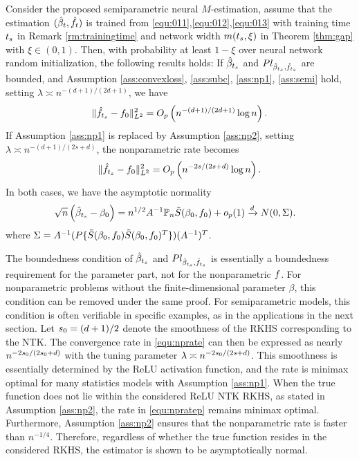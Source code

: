 \begin{theorem}\label{thm:main}
Consider the proposed semiparametric neural $M$-estimation, assume that the estimation $(\hat{\beta}_{t},\hat{f}_{t})$ is trained from \eqref{equ:011},\eqref{equ:012},\eqref{equ:013} with training time $t_{s}$ in Remark \ref{rm:trainingtime} and network width $m(t_{s},\xi)$ in Theorem \ref{thm:gap} with $\xi \in(0,1)$. 
Then, with probability at least $1-\xi$ over neural network random initialization, the following results holds: 
If $\hat{\beta}_{t_{s}}$ and $P l_{\hat{\beta}_{t_{s}},\hat{f}_{t_{s}}}$ are bounded, and Assumption \ref{ass:convexloss}, \ref{ass:subc}, \ref{ass:np1},  \ref{ass:semi} hold, 
setting $\lambda \asymp n^{-(d+1)/(2d+1)}$, 
we have 
\begin{equation}\label{equ:nprate}
    \| \hat{f}_{t_{s}} - f_{0} \|_{L^2}^2 = O_p\left( n^{-(d+1)/(2d+1)} \log n \right).  
\end{equation}
If Assumption \ref{ass:np1} is replaced by Assumption \ref{ass:np2}, setting $\lambda \asymp n^{-(d+1)/(2s+d)}$, the nonparametric rate becomes 
\begin{equation}\label{equ:npratep}
    \| \hat{f}_{t_{s}} - f_{0} \|_{L^2}^2 = O_p\left( n^{-2s/(2s+d)} \log n \right). 
\end{equation}
In both cases, we have the asymptotic normality
\begin{equation}\label{equ:normal}
\begin{aligned}
&\sqrt{n}\left(\hat{\beta}_{t_{s}}-\beta_{0}\right)=
n^{1/2}  A^{-1}  \mathbb{P}_{n} \tilde{S}(\beta_{0}, f_{0}) +o_p(1) 
\xrightarrow{d} N(0, \Sigma). 
\end{aligned}
\end{equation}
where $\Sigma=A^{-1} (P \{ \tilde{S}(\beta_{0}, f_{0})\tilde{S}(\beta_{0}, f_{0})^{T} \}) (A^{-1})^T $. 
\end{theorem}





The boundedness condition of $\hat{\beta}_{t_{s}}$ and $P l_{\hat{\beta}_{t_{s}},\hat{f}_{t_{s}}}$ is essentially a boundedness requirement for the parameter part, not for the nonparametric $f$. 
For nonparametric problems without the finite-dimensional parameter $\beta$, this condition can be removed under the same proof. 
For semiparametric models, this condition is often verifiable in specific examples, as in the applications in the next section. 
Let $s_{0} = (d+1)/2$ denote the smoothness of the RKHS corresponding to the NTK. The convergence rate in \eqref{equ:nprate} can then be expressed as nearly $n^{-2s_{0}/(2s_{0} + d)}$ with the tuning parameter $\lambda \asymp n^{-2s_{0}/(2s+d)}$. This smoothness is essentially determined by the ReLU activation function, and the rate is minimax optimal for many statistics models with Assumption \ref{ass:np1}. When the true function does not lie within the considered ReLU NTK RKHS, as stated in Assumption \ref{ass:np2}, the rate in \eqref{equ:npratep} remains minimax optimal. Furthermore, Assumption \ref{ass:np2} ensures that the nonparametric rate is faster than $n^{-1/4}$.
Therefore, regardless of whether the true function resides in the considered RKHS, the estimator is shown to be asymptotically normal.





